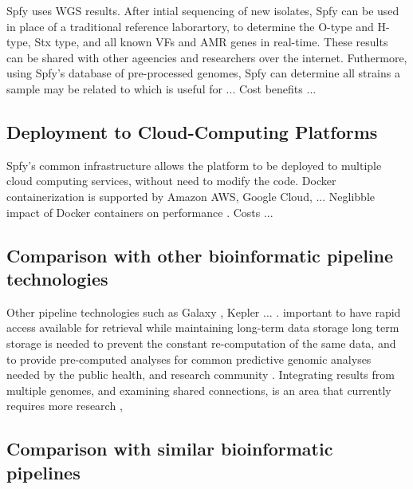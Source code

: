 \documentclass[a4,center,fleqn]{NAR}
\begin{document}
Spfy uses WGS results.
After intial sequencing of new isolates, Spfy can be used in place of a traditional reference laborartory, to determine the O-type and H-type, Stx type, and all known VFs and AMR genes in real-time.
These results can be shared with other ageencies and researchers over the internet.
Futhermore, using Spfy's database of pre-processed genomes, Spfy can determine all strains a sample may be related to which is useful for ...
Cost benefits ...

\subsection{Deployment to Cloud-Computing Platforms}
Spfy's common infrastructure allows the platform to be deployed to multiple cloud computing services, without need to modify the code.
Docker containerization is supported by Amazon AWS, Google Cloud, ...
Neglibble impact of Docker containers on performance \cite{di2015impact}.
Costs ...

\subsection{Comparison with other bioinformatic pipeline technologies}

Other pipeline technologies such as Galaxy \cite{goecks2010galaxy}, Kepler ... \cite{de2015trends}.
important to have rapid access available for retrieval while maintaining long-term data storage \cite{schatz2015biological}
long term storage is needed to prevent the constant re-computation of the same data, and to provide pre-computed analyses for common predictive genomic analyses needed by the public health, and research community \cite{de2015trends}.
Integrating results from multiple genomes, and examining shared connections, is an area that currently requires more research \cite{fricke2014bacterial},

\subsection{Comparison with similar bioinformatic pipelines}

\end{document}
